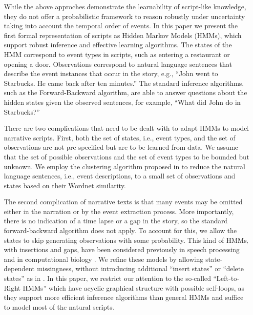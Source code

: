 \documentclass[letterpaper]{article}
\begin{document}
While the above approches demonstrate the learnability of script-like knowledge, they do not offer a probabilistic framework to reason robustly under uncertainty taking into account the temporal order of events.
In this paper we present the first formal representation of scripts as Hidden Markov Models (HMMs), which support robust inference and effective learning algorithms.
The states of the HMM correspond to event types in scripts, such as entering a restaurant or opening a door. Observations correspond to natural language sentences that describe the event instances that occur in the story, e.g., ``John went to Starbucks. He came back after ten minutes.''  The standard inference algorithms, such as the Forward-Backward algorithm, are able to answer questions about the hidden states given the observed sentences, for example, ``What did John do in Starbucks?''

There are two complications that need to be dealt with to adapt HMMs to model narrative scripts. First, both the set of states, i.e., event types, and the set of observations are not pre-specified but are to be learned from data. We assume that the set of possible observations and the set of event types to be bounded but unknown. We employ the clustering algorithm proposed in \cite{regneri2010learning} to reduce the natural language sentences, i.e., event descriptions,  to a small set of observations and states based on their Wordnet similarity.

The second complication of narrative texts is that many events may be omitted either in the narration or by the event extraction process. %
More importantly, there is no indication of a time lapse or a gap in the story, so the standard forward-backward algorithm does not apply.  To account for this, we allow the states to skip generating observations with some probability. This kind of HMMs, with insertions and gaps, have been considered previously in speech processing \cite{bahl} and in computational biology \cite{profileHMMs}. We refine these models by allowing state-dependent missingness, without introducing additional ``insert states'' or ``delete states'' as in \cite{profileHMMs}.
In this paper, we restrict our attention to the so-called ``Left-to-Right HMMs'' which
have acyclic graphical structure with possible self-loops, as they support more efficient inference algorithms than general HMMs and suffice to model most of the natural scripts. %
\end{document}
